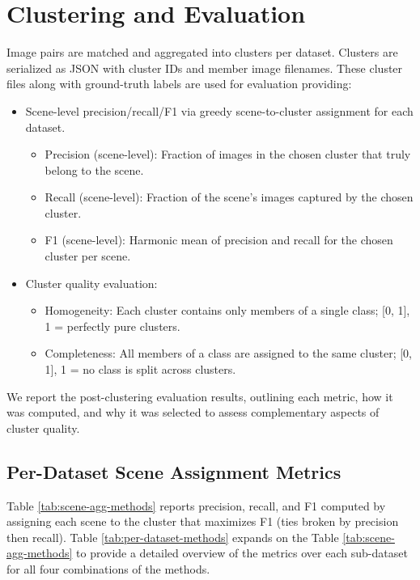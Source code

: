 \documentclass[report.tex]{subfiles}
\begin{document}
\section{Clustering and Evaluation}
Image pairs are matched and aggregated into clusters per dataset. Clusters are serialized as JSON with cluster IDs and member image filenames. These cluster files along with ground-truth labels are used for evaluation providing:
\begin{itemize}

    \item Scene-level precision/recall/F1 via greedy scene-to-cluster assignment for each dataset.
    \begin{itemize}
        \item Precision (scene-level): Fraction of images in the chosen cluster that truly belong to the scene.
        \item Recall (scene-level): Fraction of the scene’s images captured by the chosen cluster.
        \item F1 (scene-level): Harmonic mean of precision and recall for the chosen cluster per scene.
    \end{itemize}
       \item  Cluster quality evaluation: 
       \begin{itemize}
           \item Homogeneity: Each cluster contains only members of a single class; [0, 1], 1 = perfectly pure clusters.
           \item Completeness: All members of a class are assigned to the same cluster; [0, 1], 1 = no class is split across clusters.
       \end{itemize}

\end{itemize}


We report the post-clustering evaluation results, outlining each metric, how it was computed, and why it was selected to assess complementary aspects of cluster quality.

\subsection{Per-Dataset Scene Assignment Metrics}
Table \ref{tab:scene-agg-methods} reports precision, recall, and F1 computed by assigning each scene to the cluster that maximizes F1 (ties broken by precision then recall). Table \ref{tab:per-dataset-methods} expands on the  Table \ref{tab:scene-agg-methods} to provide a detailed overview of the metrics over each sub-dataset for all four combinations of the methods.
\end{document}
